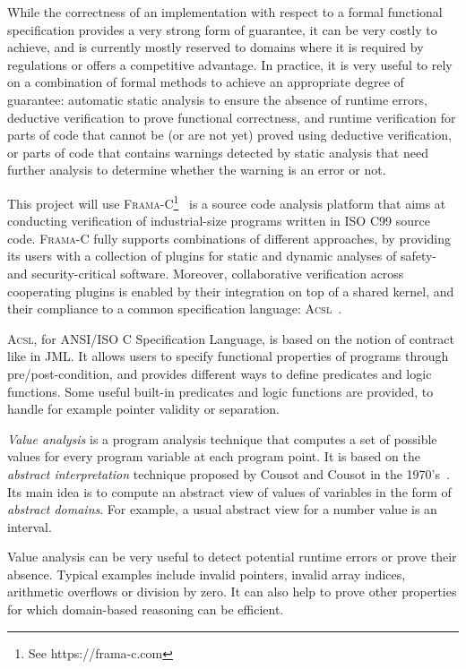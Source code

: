 \documentclass[11pt]{article}
\newcommand{\framac}{\textsc{Frama-C}\xspace}
\newcommand{\acsl}{\textsc{Acsl}\xspace}
\begin{document}
While the correctness of an implementation with respect to a formal
functional specification provides a very strong form of guarantee, it
can be very costly to achieve, and is currently mostly reserved to
domains where it is required by regulations or offers a competitive
advantage. In practice, it is very useful to rely on a combination of
formal methods to achieve an appropriate degree of guarantee:
automatic static analysis to ensure the absence of runtime errors,
deductive verification to prove functional correctness, and runtime
verification for parts of code that cannot be (or are not yet) proved
using deductive verification, or parts of code that contains warnings
detected by static analysis that need further analysis to determine
whether the warning is an error or not.

This project will use \framac{}\footnote{See
  https://frama-c.com}~\cite{KKP2015:FAC} is a source code analysis
platform that aims at conducting verification of industrial-size
programs written in ISO C99 source code. \framac{} fully supports
combinations of different approaches, by providing its users with a
collection of plugins for static and dynamic analyses of safety- and
security-critical software. Moreover, collaborative verification
across cooperating plugins is enabled by their integration on top of a
shared kernel, and their compliance to a common specification
language: \acsl~\cite{ACSL}.

\acsl, for ANSI/ISO C Specification Language, is based on the notion
of contract like in JML. It allows users to specify functional
properties of programs through pre/post-condition, and provides
different ways to define predicates and logic functions.  Some useful
built-in predicates and logic functions are provided, to handle for
example pointer validity or separation.

\emph{Value analysis} is a program analysis technique that computes a
set of possible values for every program variable at each program
point.  It is based on the \emph{abstract interpretation} technique
proposed by Cousot and Cousot in the 1970's~\cite{cousot77}.  Its main
idea is to compute an abstract view of values of variables in the form
of \emph{abstract domains}. For example, a usual abstract view for a
number value is an interval.

Value analysis can be very useful to detect potential runtime errors
or prove their absence.  Typical examples include invalid pointers,
invalid array indices, arithmetic overflows or division by zero.  It
can also help to prove other properties for which domain-based
reasoning can be efficient.
\end{document}
